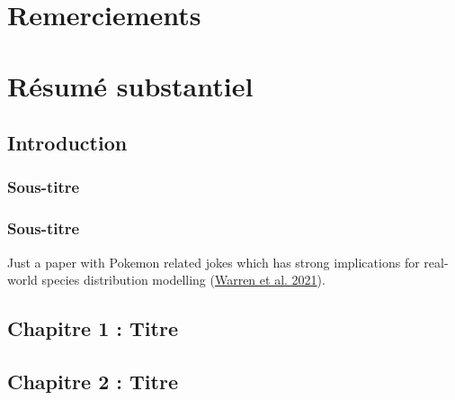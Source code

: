 \documentclass[12pt,twoside,a4paper, a]{article}
\let\oldsection\section
\renewcommand\section{\clearpage\oldsection}
\begin{document}
\newpage


\hypertarget{remerciements}{%
\section{Remerciements}\label{remerciements}}

\lipsum[1-6]

\setcounter{tocdepth}{2}
\tableofcontents
\listoftables
\listoffigures

\hypertarget{ruxe9sumuxe9-substantiel}{%
\section{Résumé substantiel}\label{ruxe9sumuxe9-substantiel}}

\hypertarget{introduction}{%
\subsection{Introduction}\label{introduction}}

\hypertarget{sous-titre}{%
\subsubsection{Sous-titre}\label{sous-titre}}

\lipsum[1-4]

\hypertarget{sous-titre-1}{%
\subsubsection{Sous-titre}\label{sous-titre-1}}

Just a paper with Pokemon related jokes which has strong implications for real-world species distribution modelling (\protect\hyperlink{ref-Warren2021}{Warren et al. 2021}).

\lipsum[5-6]

\hypertarget{chapitre-1-titre}{%
\subsection{Chapitre 1 : Titre}\label{chapitre-1-titre}}

\lipsum[7-9]

\hypertarget{chapitre-2-titre}{%
\subsection{Chapitre 2 : Titre}\label{chapitre-2-titre}}
\end{document}
